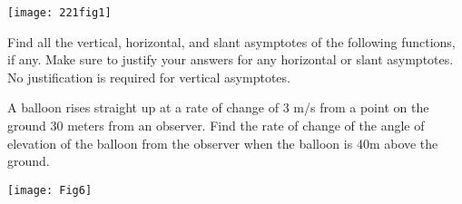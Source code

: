 \documentclass[addpoints,12pt]{exam}
\begin{document}
\begin{questions}
\texttt{[image: 221fig1]}


\newpage




\question Find all the vertical, horizontal, and slant asymptotes of the following functions, if any.
Make sure to justify your answers for any horizontal or slant asymptotes. No justification is
required for vertical asymptotes.



\newpage

 \question[12] A balloon rises straight up at a rate of change of 3 m/s from a point on the ground
30 meters from an observer. Find the rate of change of the angle of elevation of the balloon from
the observer when the balloon is 40m above the ground.

\texttt{[image: Fig6]}


\end{questions}
\end{document}

